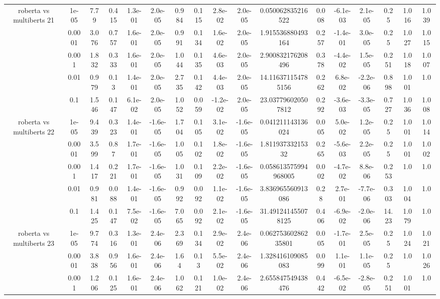 \begin{tabular}{|c|c|c|c|c|c|c|c|c|c|c|c|c|c|c|c|c|}
\hline
\multirow{5}{*}{roberta  vs multiberts 21} & 1e-05 & 7.79 & 0.415 & 1.3e-01 & 2.0e-05 & 0.984 & 0.115 & 2.8e-02 & 2.0e-05 & 0.050062835216522 & 0.008 & -6.1e-03 & 2.1e-05 & 0.25 & 1.016 & 1.039 \\
 & 0.0001 & 3.076 & 0.757 & 1.6e-01 & 2.0e-05 & 0.991 & 0.134 & 1.6e-02 & 2.0e-05 & 1.915536880493164 & 0.257 & -1.4e-01 & 3.0e-05 & 0.25 & 1.027 & 1.015 \\
 & 0.001 & 1.832 & 0.333 & 1.6e-01 & 2.0e-05 & 1.044 & 0.135 & 4.6e-03 & 2.0e-05 & 2.900832176208496 & 0.378 & -4.4e-02 & 1.5e-05 & 0.251 & 1.018 & 1.007 \\
 & 0.01 & 0.979 & 0.13 & 1.4e-01 & 2.0e-05 & 2.735 & 0.142 & 4.4e-03 & 2.0e-05 & 14.116371154785156 & 0.262 & 6.8e-02 & -2.2e-06 & 0.898 & 1.001 & 1.0 \\
 & 0.1 & 1.546 & 0.147 & 6.1e-02 & 2.0e-05 & 1.052 & 0.059 & -1.2e-02 & 2.0e-05 & 23.037796020507812 & 0.292 & -3.6e-03 & -3.3e-05 & 0.727 & 1.036 & 1.008 \\
\hline
\multirow{5}{*}{roberta  vs multiberts 22} & 1e-05 & 9.439 & 0.323 & 1.4e-01 & -1.6e-05 & 1.704 & 0.105 & 3.1e-02 & -1.6e-05 & 0.041211143136024 & 0.005 & 5.0e-02 & 1.2e-05 & 0.25 & 1.001 & 1.014 \\
 & 0.0001 & 3.599 & 0.87 & 1.7e-01 & -1.6e-05 & 1.005 & 0.102 & 1.8e-02 & -1.6e-05 & 1.81193733215332 & 0.265 & -5.6e-03 & 2.2e-05 & 0.25 & 1.001 & 1.002 \\
 & 0.001 & 1.417 & 0.221 & 1.7e-01 & -1.6e-05 & 1.031 & 0.109 & 2.2e-02 & -1.6e-05 & 0.058613575994968005 & 0.002 & -4.7e-02 & 8.8e-06 & 0.253 & 1.0 & 1.0 \\
 & 0.01 & 0.981 & 0.088 & 1.4e-01 & -1.6e-05 & 0.992 & 0.092 & 1.1e-02 & -1.6e-05 & 3.836965560913086 & 0.28 & 2.7e-01 & -7.7e-06 & 0.303 & 1.004 & 1.0 \\
 & 0.1 & 1.425 & 0.147 & 7.5e-02 & -1.6e-05 & 7.065 & 0.092 & 2.1e-02 & -1.6e-05 & 31.491241455078125 & 0.406 & -6.9e-02 & -2.0e-06 & 14.23 & 1.079 & 1.0 \\
\hline
\multirow{5}{*}{roberta  vs multiberts 23} & 1e-05 & 9.774 & 0.316 & 1.3e-01 & 2.4e-06 & 2.369 & 0.134 & 2.9e-02 & 2.4e-06 & 0.06275360286235801 & 0.005 & -1.7e-01 & 2.5e-05 & 0.25 & 1.024 & 1.021 \\
 & 0.0001 & 3.838 & 0.956 & 1.6e-01 & 2.4e-06 & 1.64 & 0.13 & 5.5e-02 & 2.4e-06 & 1.328416109085083 & 0.099 & 1.1e-01 & 1.1e-05 & 0.25 & 1.0 & 1.026 \\
 & 0.001 & 1.206 & 0.125 & 1.6e-01 & 2.4e-06 & 1.062 & 0.121 & 1.0e-02 & 2.4e-06 & 2.655847549438476 & 0.442 & -6.5e-02 & -2.8e-05 & 0.251 & 1.001 & 1.0 \\

\end{tabular}
